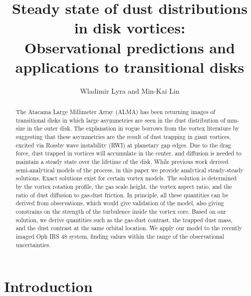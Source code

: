 \documentclass[apj]{emulateapj}
\begin{document}
\title{Steady state of dust distributions in disk vortices:\\
Observational predictions and applications to transitional disks}
\author{Wladimir Lyra and Min-Kai Lin}

\begin{abstract}
The Atacama Large Millimeter Array (ALMA) has been  returning images of transitional disks in which large asymmetries are seen in the dust distribution of 
mm-size in the outer disk. The explanation in vogue borrows from the vortex literature by suggesting 
that these asymmetries are the result of dust trapping in giant vortices, excited via Rossby wave instability (RWI) 
at planetary gap edges. Due to the drag force, dust trapped in vortices will accumulate 
in the center, and diffusion is needed to maintain a steady state over the lifetime of the disk. While previous work 
derived semi-analytical models of the process, in this paper we
provide analytical steady-steady solutions. Exact solutions exist for certain vortex models.
The solution is determined by the vortex rotation profile, the gas scale height, the 
vortex aspect ratio, and the ratio of dust diffusion to gas-dust friction. In principle, all these quantities can be derived
from observations, which would give validation of the model, also giving constrains on the strength of the turbulence 
inside the vortex core. Based on our solution, we derive quantities such as the gas-dust contrast, the trapped dust mass,
and the dust contrast at the same orbital location. We apply our model to the recently imaged Oph IRS 48 system, finding 
values within the range of the observational uncertainties.
\end{abstract}

\section{Introduction}
\label{sect:introduction}
\end{document}
